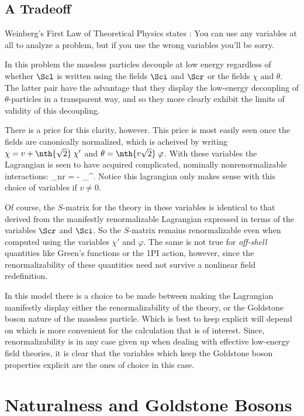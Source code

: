 \subsection{A Tradeoff}

Weinberg's First Law of Theoretical Physics states 
\cite{WeinbergGL}: You can use any variables at all to 
analyze a problem, but if you use the wrong variables you'll
be sorry.

In this problem the massless particles decouple at low energy
regardless of whether $\Scl$ is written using the fields $\Sci$
and $\Scr$ or the fields $\chi$ and $\theta$. The latter pair
have the advantage that they display the low-energy decoupling
of $\theta$-particles in a transparent way, and so they more
clearly exhibit the limits of validity of this decoupling.

There is a price for this clarity, however. This price is most 
easily seen once the fields are canonically normalized, 
which is acheived by writing $\chi = v +
\nth{\sqrt{2}} \; \chi'$ and $\theta = \nth{v \sqrt{2}} \; \varphi$. With
these variables the Lagrangian is seen to have acquired complicated,
nominally nonrenormalizable interactions:
%
\eq
\label{nrints}
\Scl_{\rm nr} = -  \; \partial_\mu \varphi \partial^\mu \varphi. 
\eeq
%
Notice this lagrangian only makes sense with this choice of variables
if $v \ne 0$.

Of course, the $S$-matrix for the theory in these variables is identical to
that derived from the manifestly renormalizable Lagrangian expressed in terms
of the variables $\Scr$ and $\Sci$. So the $S$-matrix remains renormalizable
even when computed using the variables $\chi'$ and $\varphi$. The same is not
true for {\em off-shell} quantities like Green's functions or the 1PI action,
however, since the renormalizability of these quantities need not survive a
nonlinear field redefinition. 

In this model there is a choice to be made between making the
Lagrangian manifestly display either the renormalizability of the theory, or
the Goldstone boson nature of the massless particle. Which is best to keep
explicit will depend on which is more convenient for the calculation that is
of interest. Since, renormalizability is in any case given up
when dealing with effective low-energy field theories, it is clear that the
variables which keep the Goldstone boson properties explicit are the ones of
choice in this case. 

\section{Naturalness and Goldstone Bosons}


